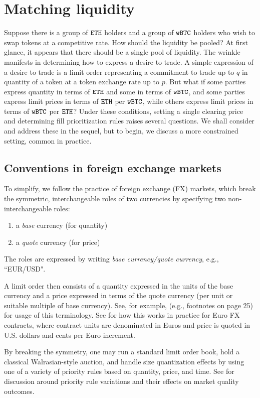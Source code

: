 \documentclass[11pt, reqno]{amsart}
\theoremstyle{definition}
\theoremstyle{remark}
\newcommand{\BTC}{\textnormal{\texttt{wBTC}}}
\newcommand{\ETH}{\textnormal{\texttt{ETH}}}
\begin{document}
\section{Matching liquidity}
Suppose there is a group of $\ETH$ holders and a group of $\BTC$ holders who
wish to swap tokens at a competitive rate.
How should the liquidity be pooled? At first glance, it appears that
there should be a single pool of liquidity. The wrinkle manifests in determining
how to express a desire to trade. A simple expression of a desire to trade is
a limit order representing a commitment to trade up to $q$ in quantity of
a token at a token exchange rate up to $p$. But what if some parties express
quantity in terms of $\ETH$ and some in terms of $\BTC$, and some parties
express limit prices in terms of $\ETH$ per $\BTC$, while others express limit
prices in terms of $\BTC$ per $\ETH$? Under these conditions, setting a single
clearing price and determining fill prioritization rules raises several
questions. We shall consider and address these in the sequel, but to begin, we
discuss a more constrained setting, common in practice.

\subsection{Conventions in foreign exchange markets}
To simplify, we follow the practice of foreign exchange (FX) markets,
which break the symmetric, interchangeable roles of two currencies by
specifying two non-interchangeable roles:
\begin{enumerate}
	\item a \emph{base} currency (for quantity)
	\item a \emph{quote} currency (for price)
\end{enumerate}
The roles are expressed by writing \emph{base currency/quote currency}, e.g.,
``EUR/USD".

A limit order then consists of a quantity expressed in the units of the base
currency and a price expressed in terms of the quote currency (per unit or
suitable multiple of base currency). See, for example, \cite{Cme23} (e.g.,
footnotes on page 25) for usage of this terminology. See \cite{CmeFx} for how
this works in practice for Euro FX contracts, where contract units are
denominated in Euros and price is quoted in U.S. dollars and cents per Euro
increment.

By breaking the symmetry, one may run a standard limit order book, hold a
classical Walrasian-style auction, and handle size quantization effects by
using one of a variety of priority rules based on quantity, price, and time.
See \cite{BeLaLiVa22} for discussion around priority rule variations and their
effects on market quality outcomes.
\end{document}
